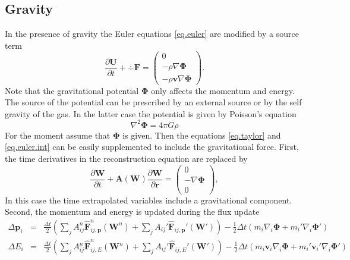 \subsection{Gravity}
\label{sec.gravity}
In the presence of gravity the Euler equations \ref{eq.euler} are modified by
a source term
%
\begin{equation}
    \frac{\partial \mathbf{U}}{\partial t} + \div \mathbf{F} =\left( 
    \begin{array}{c}
    	0 \\
        -\rho\nabla\mathbf{\Phi} \\
        -\rho\mathbf{v}\nabla\mathbf{\Phi}
    \end{array}\right).
\end{equation}
%
Note that the gravitational potential $\mathbf{\Phi}$ only affects the
momentum and energy. The source of the potential can be prescribed by
an external source or by the self gravity of the gas. In the latter case
the potential is given by Poisson's equation
%
\begin{equation}
	\nabla^2\mathbf{\Phi} = 4\pi G\rho
\end{equation}
For the moment assume that $\mathbf{\Phi}$ is given. Then the equations
\ref{eq.taylor} and \ref{eq.euler.int} can be easily supplemented to
include the gravitational force. First, the time derivatives in the
reconstruction equation are replaced by
%
\begin{equation}
    \frac{\partial\mathbf{W}}{\partial t}  + \mathbf{A}
    	\left(\mathbf{W}\right)\frac{\partial\mathbf{W}}{\partial\mathbf{r}}
        = \left(
        	\begin{array}{c}
            0 \\
            -\nabla\mathbf{\Phi} \\
            0
            \end{array}
         \right),
\end{equation}
%
In this case the time extrapolated variables include a gravitational
component. Second, the momentum and energy is updated during the flux update
%
\begin{equation}
	\label{eq.gravity.update}
	\begin{array}{rcl}
        \Delta\mathbf{p}_i & = &
        	\frac{\Delta t}{2}\left(\sum_j A_{ij}^n\mathbf{\hat{F}}_{ij,\mathbf{p}}^n
            (\mathbf{W}^n) + \sum_j A_{ij}'\mathbf{\hat{F}}_{ij,\mathbf{p}}'
            (\mathbf{W}')\right) - \frac{1}{2}\Delta t\left( 
        	m_i\nabla_i\mathbf{\Phi} + m_i'\nabla_i\mathbf{\Phi}'\right)\\
        \Delta E_i & = &
        	\frac{\Delta t}{2}\left(\sum_j A_{ij}^n\mathbf{\hat{F}}_{ij,E}^n
            (\mathbf{W}^n) + \sum_j A_{ij}'\mathbf{\hat{F}}_{ij,E}'
            (\mathbf{W}')\right) - \frac{1}{2}\Delta t\left( 
        	m_i\mathbf{v}_i\nabla_i\mathbf{\Phi} +
            m_i'\mathbf{v}_i'\nabla_i\mathbf{\Phi}'\right)\\
    \end{array}
\end{equation}
%
